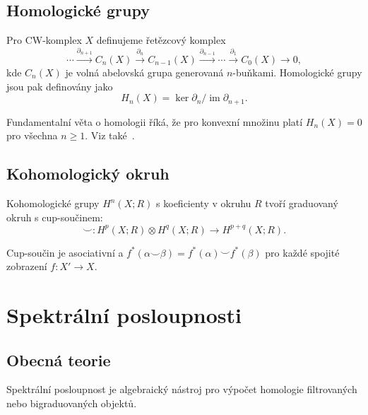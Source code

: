 \documentclass[12pt,a4paper]{article}
\theoremstyle{plain}
\theoremstyle{definition}
\theoremstyle{remark}
\begin{document}
\subsection{Homologick\'{e} grupy}

Pro CW-komplex $X$ definujeme \v{r}et\v{e}zcov\'{y} komplex
\[
\cdots \xrightarrow{\partial_{n+1}} C_n(X) \xrightarrow{\partial_n} C_{n-1}(X) \xrightarrow{\partial_{n-1}} \cdots \xrightarrow{\partial_1} C_0(X) \to 0,
\]
kde $C_n(X)$ je voln\'{a} abelovsk\'{a} grupa generovan\'{a} $n$-bu\v{n}kami.
Homologick\'{e} grupy jsou pak definov\'{a}ny jako
\begin{equation}
\label{eq:homologie}
H_n(X) = \ker \partial_n / \operatorname{im} \partial_{n+1}.
\end{equation}

Fundamentaln\'{i} v\v{e}ta o homologii \v{r}\'{i}k\'{a}, \v{z}e pro konvexn\'{i} mno\v{z}inu
plat\'{i} $H_n(X) = 0$ pro v\v{s}echna $n \geq 1$. Viz tak\'{e}~\citet{hatcher2002}.

\subsection{Kohomologick\'{y} okruh}

Kohomologick\'{e} grupy $H^n(X; R)$ s koeficienty v okruhu $R$ tvo\v{r}\'{i}
graduovan\'{y} okruh s cup-sou\v{c}inem:
\begin{equation}
\label{eq:cup}
\smile \colon H^p(X; R) \otimes H^q(X; R) \to H^{p+q}(X; R).
\end{equation}

Cup-sou\v{c}in je asociativn\'{i} a $f^*(\alpha \smile \beta) = f^*(\alpha) \smile f^*(\beta)$
pro ka\v{z}d\'{e} spojit\'{e} zobrazen\'{i} $f \colon X′ \to X$.

\section{Spektr\'{a}ln\'{i} posloupnosti}
\label{sec:spektralni}

\subsection{Obecn\'{a} teorie}

Spektr\'{a}ln\'{i} posloupnost je algebraick\'{y} n\'{a}stroj pro v\'{y}po\v{c}et
homologie filtrovan\'{y}ch nebo bigraduovan\'{y}ch objekt\r{u}.
\end{document}
